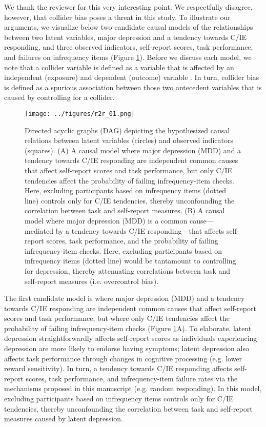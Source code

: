 \documentclass[a4paper,notitlepage,12pt]{article}
\begin{document}
We thank the reviewer for this very interesting point. We respectfully disagree, however, that collider bias poses a threat in this study. To illustrate our arguments, we visualize below two candidate causal models of the relationships between two latent variables, major depression and a tendency towards C/IE responding, and three observed indicators, self-report scores, task performance, and failures on infrequency items (Figure \ref{fig:dag}). Before we discuss each model, we note that a collider variable is defined as a variable that is affected by an independent (exposure) and dependent (outcome) variable \cite{elwert2014endogenous, wysocki2022statistical}. In turn, collider bias is defined as a spurious association between those two antecedent variables that is caused by controlling for a collider. 

\begin{figure}[t]
\texttt{[image: ../figures/r2r\_01.png]}
\centering
\captionsetup{width=\textwidth}
\caption{Directed acyclic graphs (DAG) depicting the hypothesized causal relations between latent variables (circles) and observed indicators (squares). (A) A causal model where major depression (MDD) and a tendency towards C/IE responding are independent common causes that affect self-report scores and task performance, but only C/IE tendencies affect the probability of failing infrequency-item checks. Here, excluding participants based on infrequency items (dotted line) controls only for C/IE tendencies, thereby unconfounding the correlation between task and self-report measures. (B) A causal model where major depression (MDD) is a common cause---mediated by a tendency towards C/IE responding---that affects self-report scores, task performance, and the probability of failing infrequency-item checks. Here, excluding participants based on infrequency items (dotted line) would be tantamount to controlling for depression, thereby attenuating correlations between task and self-report measures (i.e. overcontrol bias).}
\label{fig:dag}
\end{figure}

The first candidate model is where major depression (MDD) and a tendency towards C/IE responding are independent common causes that affect self-report scores and task performance, but where only C/IE tendencies affect the probability of failing infrequency-item checks (Figure \ref{fig:dag}A). To elaborate, latent depression straightforwardly affects self-report scores as individuals experiencing depression are more likely to endorse having symptoms; latent depression also affects task performance through changes in cognitive processing (e.g. lower reward sensitivity). In turn, a tendency towards C/IE responding affects self-report scores, task performance, and infrequency-item failure rates via the mechanisms proposed in this manuscript (e.g. random responding). In this model, excluding participants based on infrequency items controls only for C/IE tendencies, thereby unconfounding the correlation between task and self-report measures caused by latent depression. 
\end{document}
